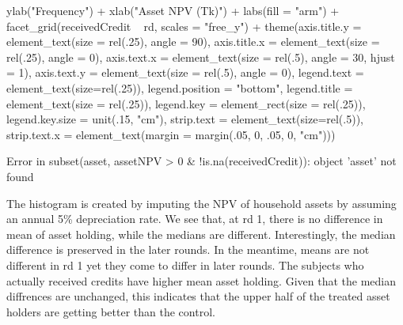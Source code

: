 \begin{Schunk}
\begin{Sinput}
	ylab("Frequency") + xlab("Asset NPV (Tk)") + labs(fill = "arm") +
	facet_grid(receivedCredit ~ rd, scales = "free_y") + 
	theme(axis.title.y = element_text(size = rel(.25), angle = 90), 
		axis.title.x = element_text(size = rel(.25), angle = 0),
		axis.text.x = element_text(size = rel(.5), angle = 30, hjust = 1),
		axis.text.y = element_text(size = rel(.5), angle = 0),
		legend.text = element_text(size=rel(.25)), 
		legend.position = "bottom", 
		legend.title = element_text(size = rel(.25)),
		legend.key = element_rect(size = rel(.25)),
		legend.key.size = unit(.15, "cm"),
		strip.text = element_text(size=rel(.5)),
		strip.text.x = element_text(margin = margin(.05, 0, .05, 0, "cm")))
\end{Sinput}
\begin{Soutput}
Error in subset(asset, assetNPV > 0 & !is.na(receivedCredit)): object 'asset' not found
\end{Soutput}
\end{Schunk}
The histogram is created by imputing the NPV of household assets by assuming an annual 5\% depreciation rate. We see that, at rd 1, there is no difference in mean of asset holding, while the medians are different. Interestingly, the median difference is preserved in the later rounds. In the meantime, means are not different in rd 1 yet they come to differ in later rounds. The subjects who actually received credits have higher mean asset holding. Given that the median diffrences are unchanged, this indicates that the upper half of the treated asset holders are getting better than the control.

